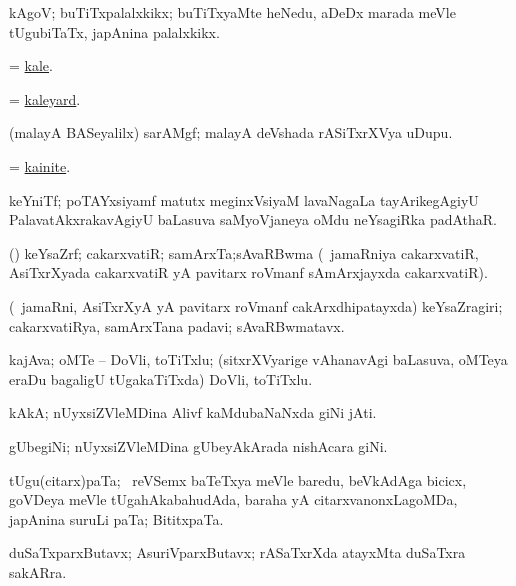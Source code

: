 \bentry
{}
\gl{\nA}
\bmng
kAgoV; buTiTxpalalxkikx; buTiTxyaMte heNedu, aDeDx marada meVle tUgubiTaTx, japAnina palalxkikx. 
\emng
\eentry

\bentry
{}
\gl{\nA}
\bmng
 = \hyperlink{kale}{kale}. 
\emng
\eentry

\bentry
{}
\gl{\nA}
\bmng
 = \hyperlink{kaleyard}{kaleyard}. 
\emng
\eentry

\bentry
{}
\gl{\nA}
\bmng
(malayA BASeyalilx) sarAMgf; malayA deVshada rASiTxrXVya uDupu. 
\emng
\eentry

\bentry
{}
\gl{\nA}
\bmng
 = \hyperlink{kainite}{kainite}. 
\emng
\eentry

\bentry
{}
\gl{\nA}
\bmng
keYniTf; poTAYxsiyamf matutx meginxVsiyaM lavaNagaLa tayArikegAgiyU PalavatAkxrakavAgiyU baLasuva    saMyoVjaneya oMdu neYsagiRka padAthaR. 
\emng
\eentry

\bentry
{}
\gl{\nA}
\bmng
(\ca) keYsaZrf; cakarxvatiR; samArxTa;sAvaRBwma (\kanmu\ jamaRniya cakarxvatiR, AsiTxrXyada cakarxvatiR yA pavitarx roVmanf sAmArxjayxda cakarxvatiR). 
\emng
\eentry

\bentry
{}
\gl{\nA}
\bmng
(\kanmu\ jamaRni, AsiTxrXyA yA pavitarx roVmanf cakArxdhipatayxda) keYsaZragiri; cakarxvatiRya, samArxTana padavi; sAvaRBwmatavx. 
\emng
\eentry

\bentry
{}
\gl{\nA}
\bmng
kajAva; oMTe -- DoVli, toTiTxlu; (sitxrXVyarige vAhanavAgi baLasuva, oMTeya eraDu bagaligU tUgakaTiTxda) DoVli, toTiTxlu. 
\emng
\eentry

\bentry
{}
\gl{\nA}
\bmng
kAkA; nUyxsiZVleMDina Alivf kaMdubaNaNxda giNi jAti. 
\emng
\eentry

\bentry
{}
\gl{\nA}
\bmng
gUbegiNi; nUyxsiZVleMDina gUbeyAkArada nishAcara giNi. 
\emng
\eentry

\bentry
{}
\gl{\nA}
\bmng
tUgu(citarx)paTa; \sA\ reVSemx baTeTxya meVle baredu, beVkAdAga bicicx, goVDeya meVle tUgahAkabahudAda, baraha yA citarxvanonxLagoMDa, japAnina suruLi paTa; BititxpaTa. 
\emng
\eentry

\bentry
{}
\gl{\nA}
\bmng
duSaTxparxButavx; AsuriVparxButavx; rASaTxrXda atayxMta duSaTxra sakARra. 
\emng
\eentry

